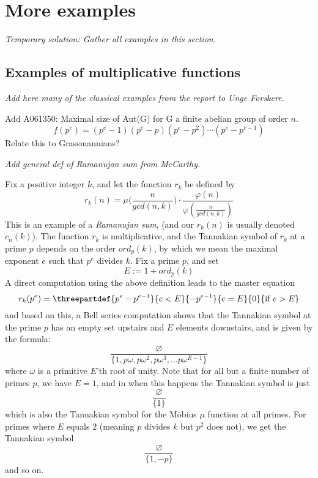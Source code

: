 
\section{More examples}

\emph{Temporary solution: Gather all examples in this section.}

\subsection{Examples of multiplicative functions}


\emph{Add here many of the classical examples from the report to Unge Forskere.}



\begin{example}
Add A061350: Maximal size of Aut(G) for G a finite abelian group of order $n$. 
$$  f(p^e) = (p^e-1)(p^e-p)(p^e-p^2)\cdots (p^e-p^{e-1})   $$
Relate this to Grassmannians?
\end{example}

\begin{example}

\emph{Add general def of Ramanujan sum from McCarthy.}


Fix a positive integer $k$, and let the function $r_k$ be defined by
$$r_k(n) = \mu \big(   \frac{n}{gcd(n, k)}    \big) \cdot \frac{ \varphi(n)   }{  \varphi(\frac{n}{gcd(n, k)})  }  $$  
This is an example of a \emph{Ramanujan sum}, (and our $r_k(n)$ is usually denoted $c_n(k)$). The function $r_k$ is multiplicative, and the Tannakian symbol of $r_k$ at a prime $p$ depends on the order $ord_p(k)$, by which we mean the maximal exponent $e$ such that $p^e$ divides $k$. Fix a prime $p$, and set
$$  E:= 1+ ord_p(k) $$
A direct computation using the above definition leads to the master equation
$$  r_k(p^e) =  \threepartdef { p^e-p^{e-1} } { e < E } {-p^{e-1}} { e = E  } {0}  { \textrm{if } e > E} $$
and based on this, a Bell series computation shows that the Tannakian symbol at the prime $p$ has an empty set upstairs and $E$ elements downstairs, and is given by the formula:
$$  \frac{  \varnothing }{  \{ 1, p \omega, p \omega^2, p \omega^3, \ldots p \omega^{E-1}  \} }   $$
where $\omega$ is a primitive $E$'th root of unity. Note that for all but a finite number of primes $p$, we have $E=1$, and in when this happens the Tannakian symbol is just
$$   \frac{  \varnothing }{ \{ 1\} }    $$
which is also the Tannakian symbol for the M{\"o}bius $\mu$ function at all primes. For primes where $E$ equals $2$ (meaning $p$ divides $k$ but $p^2$ does not), we get the Tannakian symbol
$$   \frac{  \varnothing }{  \{ 1, -p \} }    $$
and so on.
\end{example}


